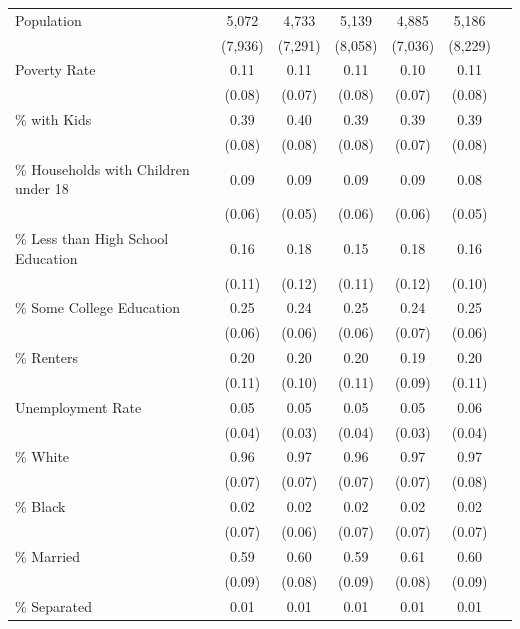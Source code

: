 \begin{longtable}{p{4cm}cccccc}
    Population & 5,072 & 4,733 & 5,139 & 4,885 & 5,186 \\
                & (7,936) & (7,291) & (8,058) & (7,036) & (8,229) \\
    Poverty Rate & 0.11 & 0.11 & 0.11 & 0.10 & 0.11 \\
                    & (0.08) & (0.07) & (0.08) & (0.07) & (0.08) \\
    \% with Kids & 0.39 & 0.40 & 0.39 & 0.39 & 0.39 \\
                    & (0.08) & (0.08) & (0.08) & (0.07) & (0.08) \\
    \% Households with Children under 18 & 0.09 & 0.09 & 0.09 & 0.09 & 0.08 \\[-2.3em]
                                            & (0.06) & (0.05) & (0.06) & (0.06) & (0.05) \\
    \% Less than High School Education & 0.16 & 0.18 & 0.15 & 0.18 & 0.16 \\[-2.3em]
                                        & (0.11) & (0.12) & (0.11) & (0.12) & (0.10) \\
    \% Some College Education & 0.25 & 0.24 & 0.25 & 0.24 & 0.25 \\[-2.3em]
                                & (0.06) & (0.06) & (0.06) & (0.07) & (0.06) \\
    \% Renters & 0.20 & 0.20 & 0.20 & 0.19 & 0.20 \\
                & (0.11) & (0.10) & (0.11) & (0.09) & (0.11) \\
    Unemployment Rate & 0.05 & 0.05 & 0.05 & 0.05 & 0.06 \\
                            & (0.04) & (0.03) & (0.04) & (0.03) & (0.04) \\
    \% White & 0.96 & 0.97 & 0.96 & 0.97 & 0.97 \\
                & (0.07) & (0.07) & (0.07) & (0.07) & (0.08) \\
    \% Black & 0.02 & 0.02 & 0.02 & 0.02 & 0.02 \\
                & (0.07) & (0.06) & (0.07) & (0.07) & (0.07) \\
    \% Married & 0.59 & 0.60 & 0.59 & 0.61 & 0.60 \\
                & (0.09) & (0.08) & (0.09) & (0.08) & (0.09) \\
    \% Separated & 0.01 & 0.01 & 0.01 & 0.01 & 0.01 \\

\end{longtable}
